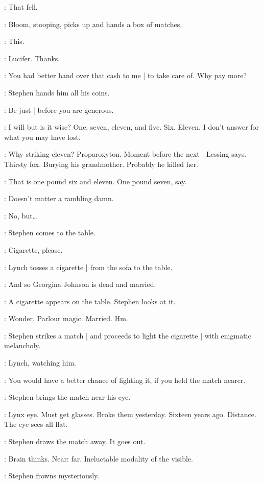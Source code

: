 \Stephen:
That fell.

:
Bloom,
stooping,
picks up and hands a box of matches.

\Bloom:
This.

\Stephen:
Lucifer.
Thanks.

\Bloom:
You had better hand over that cash to me |
to take care of.
Why pay more?

:
Stephen hands him all his coins.

\Stephen:
Be just |
before you are generous.

\Bloom:
I will but is it wise?
One,
seven,
eleven,
and five.
Six.
Eleven.
I don't answer for what you may have lost.

\Stephen:
Why striking eleven?
Proparoxyton.
Moment before the next |
Lessing says.
Thirsty fox.
Burying his grandmother.
Probably he killed her.

\Bloom:
That is one pound six and eleven.
One pound seven,
say.

\Stephen:
Doesn't matter a rambling damn.

\Bloom:
No,
but…

:
Stephen comes to the table.

\Stephen:
Cigarette,
please.

:
Lynch tosses a cigarette |
from the sofa to the table.

\Stephen:
And so Georgina Johnson is dead and married.

:
A cigarette appears on the table.
Stephen looks at it.

\Stephen:
Wonder.
Parlour magic.
Married.
Hm.

:
Stephen strikes a match |
and proceeds to light the cigarette |
with enigmatic melancholy.

:
Lynch,
watching him.

\Lynch:
You would have a better chance of lighting it,
if you held the match nearer.

:
Stephen brings the match near his eye.

\Stephen:
Lynx eye.
Must get glasses.
Broke them yesterday.
Sixteen years ago.
Distance.
The eye sees all flat.

:
Stephen draws the match away.
It goes out.

\Stephen:
Brain thinks.
Near:
far.
Ineluctable modality of the visible.

:
Stephen frowns mysteriously.

